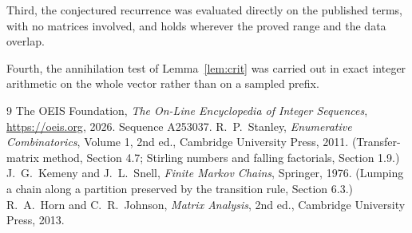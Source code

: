 \documentclass[11pt,a4paper]{article}
\theoremstyle{plain}
\theoremstyle{definition}
\begin{document}
Third, the conjectured recurrence was evaluated directly on the published terms, with no
matrices involved, and holds wherever the proved range and the data overlap.

Fourth, the annihilation test of Lemma~\ref{lem:crit} was carried out in exact integer
arithmetic on the whole vector rather than on a sampled prefix.

\begin{thebibliography}{9}
 The OEIS Foundation, \emph{The On-Line Encyclopedia of Integer
Sequences}, \url{https://oeis.org}, 2026. Sequence A253037.
 R.~P.~Stanley, \emph{Enumerative Combinatorics}, Volume 1, 2nd ed.,
Cambridge University Press, 2011. (Transfer-matrix method, Section 4.7; Stirling numbers and
falling factorials, Section 1.9.)
 J.~G.~Kemeny and J.~L.~Snell, \emph{Finite Markov Chains}, Springer,
1976. (Lumping a chain along a partition preserved by the transition rule, Section 6.3.)
 R.~A.~Horn and C.~R.~Johnson, \emph{Matrix Analysis}, 2nd ed., Cambridge
University Press, 2013.
\end{thebibliography}
\end{document}
